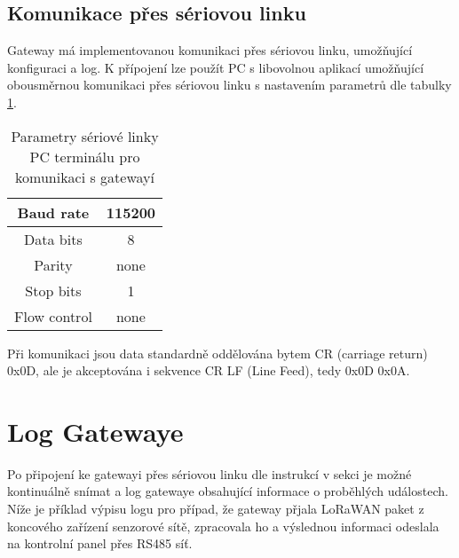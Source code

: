 
\subsection{Komunikace přes sériovou linku}
\label{Komunikace přes sériovou linku}
Gateway má implementovanou komunikaci přes sériovou linku, umožňující konfiguraci a log. 
K přípojení lze použít PC s libovolnou aplikací umožňující obousměrnou komunikaci přes sériovou linku s nastavením parametrů dle tabulky \ref{table:usb_term}.

\begin{table}[!h]
    \centering
    \begin{ctucolortab}
    \begin{tabular}{ |c|c| }
     \hline

     Baud rate              & 115200           \\ \hline
     Data bits              & 8                 \\ \hline
     Parity                 & none              \\ \hline
     Stop bits              & 1                 \\ \hline
     Flow control           & none               \\ \hline

    \end{tabular}
    \end{ctucolortab}
    \caption{Parametry sériové linky PC terminálu pro komunikaci s gatewayí}
    \label{table:usb_term}
\end{table}

Při komunikaci jsou data standardně oddělována bytem CR (carriage return) 0x0D, ale je akceptována i sekvence CR LF (Line Feed), tedy 0x0D 0x0A. 

\section{Log Gatewaye}
Po připojení ke gatewayi přes sériovou linku dle instrukcí v sekci  je možné kontinuálně snímat a log gatewaye obsahující informace o proběhlých událostech.
Níže je příklad výpisu logu pro případ, že gateway přjala LoRaWAN paket z koncového zařízení senzorové sítě, zpracovala ho a výslednou informaci odeslala na kontrolní panel přes RS485 síť.

